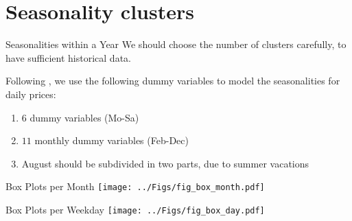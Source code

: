 \documentclass{beamer}
\begin{document}




\section{Seasonality clusters}

\begin{frame}{Seasonalities within a Year}
    We should choose the number of clusters carefully, to have sufficient historical data.

    Following \cite{SteinErikParaschivSchuerle-2013}, we use the following dummy variables to model the seasonalities for daily prices:
    \begin{enumerate}[label=--]
        \item $6$ dummy variables (Mo-Sa)

        \item $11$ monthly dummy variables (Feb-Dec)

        \item August should be subdivided in two parts, due to summer vacations
    \end{enumerate}
\end{frame}


\begin{frame}{Box Plots per Month}
    \texttt{[image: ../Figs/fig\_box\_month.pdf]}
\end{frame}


\begin{frame}{Box Plots per Weekday}
    \texttt{[image: ../Figs/fig\_box\_day.pdf]}
\end{frame}
\end{document}
